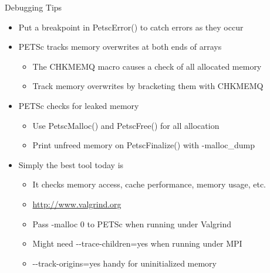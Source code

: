 \begin{frame}{Debugging Tips}

\begin{itemize}
  \item Put a breakpoint in {\kb PetscError()} to catch errors as they occur

  \item PETSc tracks memory overwrites at both ends of arrays
  \begin{itemize}
    \item The {\kb CHKMEMQ} macro causes a check of all allocated memory

    \item Track memory overwrites by bracketing them with {\kb CHKMEMQ}
  \end{itemize}

  \item PETSc checks for leaked memory
  \begin{itemize}
    \item Use {\kb PetscMalloc()} and {\kb PetscFree()} for all allocation

    \item Print unfreed memory on {\kb PetscFinalize()} with {\kb -malloc\_dump}
  \end{itemize}

  \item Simply the best tool today is 
  \begin{itemize}
    \item It checks memory access, cache performance, memory usage, etc.

    \item \href{http://www.valgrind.org}{http://www.valgrind.org}

    \item Pass {\kb -malloc 0} to PETSc when running under Valgrind
    \item Might need {\kb -{}-trace-children=yes} when running under MPI
    \item {\kb -{}-track-origins=yes} handy for uninitialized memory
  \end{itemize}
\end{itemize}

\end{frame}
